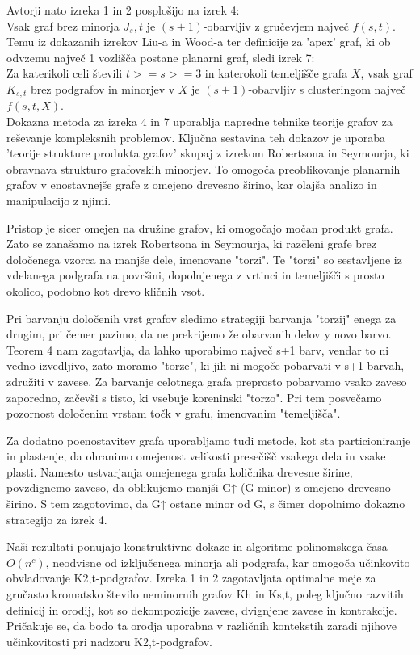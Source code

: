 \documentclass{article}
\begin{document}
Avtorji nato izreka 1 in 2 posplošijo na izrek 4:\\
Vsak graf brez minorja $J_s,t$ je $(s+1)$-obarvljiv z gručevjem največ $f(s, t)$.\\

Temu iz dokazanih izrekov Liu-a in Wood-a ter definicije za 'apex' graf, ki ob odvzemu največ 1 vozlišča postane planarni graf, sledi izrek 7:\\
Za katerikoli celi števili $t >= s >= 3$ in katerokoli temeljišče grafa $X$, vsak graf $K_{s,t}$ brez podgrafov in minorjev v $X$ je $(s + 1)$-obarvljiv s clusteringom največ $f(s, t, X)$.\\

Dokazna metoda za izreka 4 in 7 uporablja napredne tehnike teorije grafov za reševanje kompleksnih problemov. Ključna sestavina teh dokazov je uporaba 'teorije strukture produkta grafov' skupaj z izrekom Robertsona in Seymourja, ki obravnava strukturo grafovskih minorjev. To omogoča preoblikovanje planarnih grafov v enostavnejše grafe z omejeno drevesno širino, kar olajša analizo in manipulacijo z njimi.

Pristop je sicer omejen na družine grafov, ki omogočajo močan produkt grafa. Zato se zanašamo na izrek Robertsona in Seymourja, ki razčleni grafe brez določenega vzorca na manjše dele, imenovane "torzi". Te "torzi" so sestavljene iz vdelanega podgrafa na površini, dopolnjenega z vrtinci in temeljišči s prosto okolico, podobno kot drevo kličnih vsot.

Pri barvanju določenih vrst grafov sledimo strategiji barvanja "torzij" enega za drugim, pri čemer pazimo, da ne prekrijemo že obarvanih delov y novo barvo. Teorem 4 nam zagotavlja, da lahko uporabimo največ s+1 barv, vendar to ni vedno izvedljivo, zato moramo "torze", ki jih ni mogoče pobarvati v s+1 barvah, združiti v zavese. Za barvanje celotnega grafa preprosto pobarvamo vsako zaveso zaporedno, začevši s tisto, ki vsebuje koreninski "torzo". Pri tem posvečamo pozornost določenim vrstam točk v grafu, imenovanim "temeljišča".

Za dodatno poenostavitev grafa uporabljamo tudi metode, kot sta particioniranje in plastenje, da ohranimo omejenost velikosti presečišč vsakega dela in vsake plasti. Namesto ustvarjanja omejenega grafa količnika drevesne širine, povzdignemo zaveso, da oblikujemo manjši G↑ (G minor) z omejeno drevesno širino. S tem zagotovimo, da G↑ ostane minor od G, s čimer dopolnimo dokazno strategijo za izrek 4.

Naši rezultati ponujajo konstruktivne dokaze in algoritme polinomskega časa $O(n^c)$, neodvisne od izključenega minorja ali podgrafa, kar omogoča učinkovito obvladovanje K2,t-podgrafov. Izreka 1 in 2 zagotavljata optimalne meje za gručasto kromatsko število neminornih grafov Kh in Ks,t, poleg ključno razvitih definicij in orodij, kot so dekompozicije zavese, dvignjene zavese in kontrakcije. Pričakuje se, da bodo ta orodja uporabna v različnih kontekstih zaradi njihove učinkovitosti pri nadzoru K2,t-podgrafov.
\end{document}
